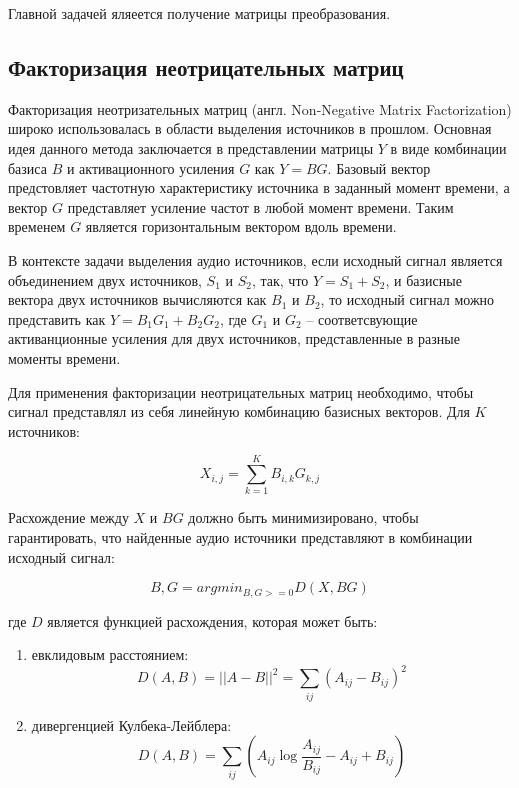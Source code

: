 Главной задачей яляеется получение матрицы преобразования.

\subsection{Факторизация неотрицательных матриц}

Факторизация неотризательных матриц (англ. Non-Negative Matrix Factorization) широко использовалась в области выделения источников в прошлом. Основная идея данного метода заключается в представлении матрицы $Y$ в виде комбинации базиса $B$ и активационного усиления $G$ как $Y=BG$. Базовый вектор предстовляет частотную характеристику источника в заданный момент времени, а вектор $G$ представляет усиление частот в любой момент времени. Таким временем $G$ является горизонтальным вектором вдоль времени.

В контексте задачи выделения аудио источников, если исходный сигнал является объединением двух источников, $S_1$ и $S_2$, так, что $Y = S_1 + S_2$, и базисные вектора двух источников вычисляются как $B_1$ и $B_2$, то исходный сигнал можно представить как $Y = B_1 G_1 + B_2 G_2$, где $G_1$ и $G_2$ -- соответсвующие активанционные усиления для двух источников, представленные в разные моменты времени. 

Для применения факторизации неотрицательных матриц необходимо, чтобы сигнал представлял из себя линейную комбинацию базисных векторов. Для $K$ источников:

\begin{equation}
X_{i,j} = \sum_{k=1}^{K} B_{i,k} G_{k, j}
\end{equation}

Расхождение между $X$ и $BG$ должно быть минимизировано, чтобы гарантировать, что найденные аудио источники представляют в комбинации исходный сигнал:

\begin{equation}
{B, G} = argmin_{B, G >= 0} D (X, BG)
\end{equation}

где $D$ является функцией расхождения, которая может быть:

\begin{enumerate}
	\item евклидовым расстоянием:
	\begin{equation}
	D (A, B) = ||A-B||^2 = \sum_{ij}(A_{ij} - B_{ij})^2
	\end{equation}
	\item дивергенцией Кулбека-Лейблера:
	\begin{equation}
		D (A, B) = \sum_{ij} (A_{ij} \log\frac{A_{ij}}{B_{ij}} - A_{ij} + B_{ij})
	\end{equation}
\end{enumerate}

